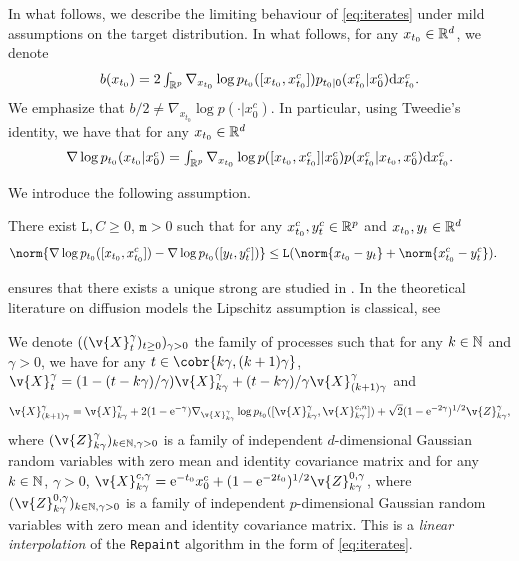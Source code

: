 In what follows, we describe the limiting behaviour of \eqref{eq:iterates} under mild assumptions on the target distribution.
In what follows, for any $x_{t_0} \in \mathbb{R}^d$, we denote \begin{equation} \textstyle b(x_{t_0}) = 2\int_{\mathbb{R}^p} \nabla_{x_{t_0}} \log p_{t_0}([x_{t_0}, x_{t_0}^c]) p_{t_0|0}(x_{t_0}^c|x_0^c) \mathrm{d} x_{t_0}^c .
\end{equation}
We emphasize that $b/2 \neq \nabla_{x_{t_0}} \log p(\cdot | x_0^c)$.
In particular, using Tweedie's identity, we have that for any $x_{t_0} \in \mathbb{R}^d$ \begin{equation} \textstyle \nabla \log p_{t_0}(x_{t_0}|x_0^c) = \int_{\mathbb{R}^p} \nabla_{x_{t_0}} \log p([x_{t_0}, x_{t_0}^c] | x_0^c) p(x_{t_0}^c|x_{t_0},x_0^c) \mathrm{d} x_{t_0}^c .
\end{equation}

We introduce the following assumption.

\begin{assumption}
	\label{assum:sde}
	There exist $\mathtt{L}, C \geq 0$, $\mathtt{m} >0$ such that for any $x_{t_0}^c, y_t^c \in \mathbb{R}^p$ and $x_{t_0}, y_t \in \mathbb{R}^d$ \begin{align}  & \norm{\nabla \log p_{t_0}([x_{t_0}, x_{t_0}^c]) - \nabla \log p_{t_0}([y_t, y_t^c])} \leq \mathtt{L} (\norm{x_{t_0} - y_t} + \norm{x_{t_0}^c - y_t^c}) .
	\end{align}
\end{assumption}

 ensures that there exists a unique strong
are studied in
\textcite{de2022convergence}.
In the theoretical literature on diffusion models the Lipschitz assumption is classical, see 

We denote $((\v{X}_t^\gamma)_{t \geq 0})_{\gamma > 0}$ the family of processes such that for any $k \in \mathbb{N}$ and $\gamma >0$, we have for any $t \in \cobr{k \gamma, (k+1)\gamma}$, $\v{X}_t^\gamma = (1 - (t - k\gamma)/\gamma) \v{X}_{k\gamma}^\gamma + (t - k\gamma)/\gamma \v{X}_{(k+1)\gamma}^\gamma$ and \begin{equation} \v{X}_{(k+1)\gamma}^\gamma = \v{X}_{k\gamma}^\gamma + 2(1-\mathrm{e}^{-\gamma}) \nabla_{\v{X}_{k\gamma}^\gamma} \log p_{t_0}([\v{X}_{k\gamma}^\gamma, \v{X}_{k\gamma}^{c,n}]) + \sqrt{2}(1-\mathrm{e}^{-2\gamma})^{1/2} \v{Z}_{k\gamma}^\gamma , \end{equation} where $(\v{Z}_{k\gamma}^\gamma)_{k \in \N, \gamma > 0}$ is a family of independent $d$-dimensional Gaussian random variables with zero mean and identity covariance matrix and for any $k\in \mathbb{N}$, $\gamma > 0$, $\v{X}_{k\gamma}^{c,\gamma} = \mathrm{e}^{-t_0} x_0^c + (1 - \mathrm{e}^{-2t_0})^{1/2} \v{Z}_{k\gamma}^{0,\gamma}$, where $(\v{Z}_{k\gamma}^{0,\gamma})_{k \in \N, \gamma > 0}$ is a family of independent $p$-dimensional Gaussian random variables with zero mean and identity covariance matrix.
This is a \emph{linear interpolation} of the \texttt{Repaint} algorithm in the form of \eqref{eq:iterates}.


